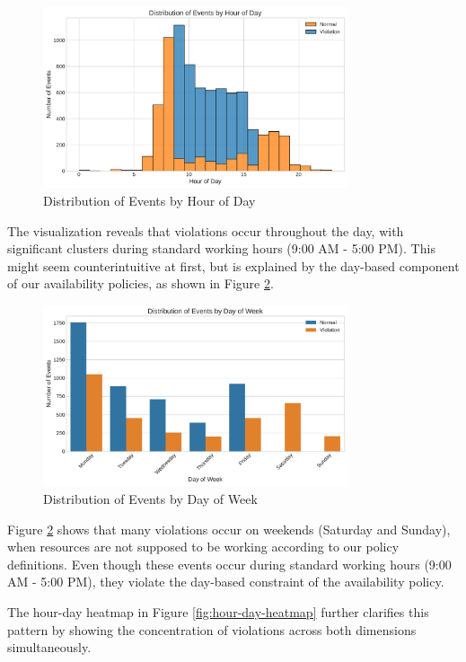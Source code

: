 \begin{figure}[h]
\centering
\includegraphics[width=0.8\textwidth]{figures/events_by_hour_distribution.pdf}
\caption{Distribution of Events by Hour of Day}
\label{fig:events-by-hour}
\end{figure}

The visualization reveals that violations occur throughout the day, with significant clusters during standard working hours (9:00 AM - 5:00 PM). This might seem counterintuitive at first, but is explained by the day-based component of our availability policies, as shown in Figure \ref{fig:events-by-day}.

\begin{figure}[h]
\centering
\includegraphics[width=0.8\textwidth]{figures/events_by_day_distribution.pdf}
\caption{Distribution of Events by Day of Week}
\label{fig:events-by-day}
\end{figure}

Figure \ref{fig:events-by-day} shows that many violations occur on weekends (Saturday and Sunday), when resources are not supposed to be working according to our policy definitions. Even though these events occur during standard working hours (9:00 AM - 5:00 PM), they violate the day-based constraint of the availability policy.

The hour-day heatmap in Figure \ref{fig:hour-day-heatmap} further clarifies this pattern by showing the concentration of violations across both dimensions simultaneously.

